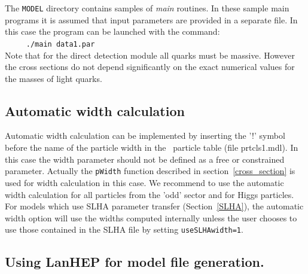 \documentclass[12pt,a4paper]{article}
\begin{document}
The {\tt MODEL} directory contains  samples of {\it main}
routines. In these sample main programs it is assumed that input parameters are provided in a separate
file. In this case the  program can be launched with the command:\\
\verb|     ./main data1.par|\\
Note that for the direct detection module all quarks must be  massive. 
However the cross sections do not depend significantly on the exact  
numerical values for the masses of light quarks.

 
\subsection{Automatic width calculation}
Automatic width calculation can be 
implemented by  inserting the '!' symbol before the name of the particle width  in 
the \calchep\ particle table (file prtcls1.mdl). In this case the width parameter 
should not be defined as a free or constrained parameter. 
Actually the \verb|pWidth| function  described in section~\ref{cross_section} is  used for width calculation in this case.
We recommend to use the
automatic width calculation for all particles from the 'odd' sector and for
Higgs particles. 
For models which use SLHA parameter transfer (Section~\ref{SLHA}), 
the automatic width option will use the widths computed internally unless the user chooses to use those contained  in the SLHA file  by setting {\tt useSLHAwidth=1}. 


\subsection{Using LanHEP for model file generation.}
\end{document}
